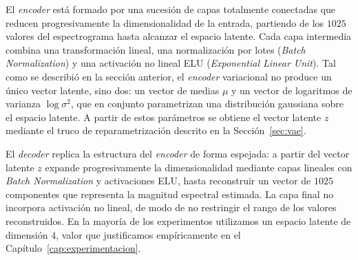 \documentclass[12pt,a4paper,twoside]{tesis}
\begin{document}
\begin{figure}[H]
\end{figure}

El \textit{encoder} está formado por una sucesión de capas totalmente conectadas que reducen progresivamente la dimensionalidad de la entrada, partiendo de los $1025$ valores del espectrograma hasta alcanzar el espacio latente. Cada capa intermedia combina una transformación lineal, una normalización por lotes (\textit{Batch Normalization}) y una activación no lineal ELU (\textit{Exponential Linear Unit}). Tal como se describió en la sección anterior, el \textit{encoder} variacional no produce un único vector latente, sino dos: un vector de medias $\mu$ y un vector de logaritmos de varianza $\log\sigma^2$, que en conjunto parametrizan una distribución gaussiana sobre el espacio latente. A partir de estos parámetros se obtiene el vector latente $z$ mediante el truco de reparametrización descrito en la Sección~\ref{sec:vae}.

El \textit{decoder} replica la estructura del \textit{encoder} de forma espejada: a partir del vector latente $z$ expande progresivamente la dimensionalidad mediante capas lineales con \textit{Batch Normalization} y activaciones ELU, hasta reconstruir un vector de $1025$ componentes que representa la magnitud espectral estimada. La capa final no incorpora activación no lineal, de modo de no restringir el rango de los valores reconstruidos. En la mayoría de los experimentos utilizamos un espacio latente de dimensión $4$, valor que justificamos empíricamente en el Capítulo~\ref{cap:experimentacion}.
\end{document}
